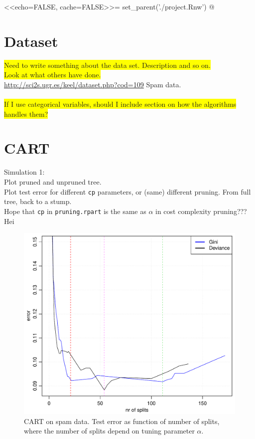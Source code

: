 <<echo=FALSE, cache=FALSE>>=
set_parent('./project.Rnw')
@


\section{Dataset}
\label{sec:Dataset}
\colorbox{yellow}{Need to write something about the data set. Description and so on.}\\
\colorbox{yellow}{Look at what others have done.} \\
\url{http://sci2s.ugr.es/keel/dataset.php?cod=109} Spam data.\\
\\
\colorbox{yellow}{If I use categorical variables, should I include section on how the algorithms handles them?}

\section{CART}
\label{sec:CARTsim}
Simulation 1: \\
Plot pruned and unpruned tree. \\
Plot test error for different \verb+cp+ parameters, or (same) different pruning. From full tree, back to a stump.\\
Hope that \verb+cp+ in \verb+pruning.rpart+ is the same as $\alpha$ in cost complexity pruning??? Hei

\begin{figure}[h!]
\begin{center}
    \includegraphics[scale=0.5]{./figures/cartCPSpam.pdf}
\end{center}
\caption{CART on spam data. Test error as function of number of splits, where the number of splits depend on tuning parameter $\alpha$.}
\label{fig:cartCPSpam}
\end{figure}

